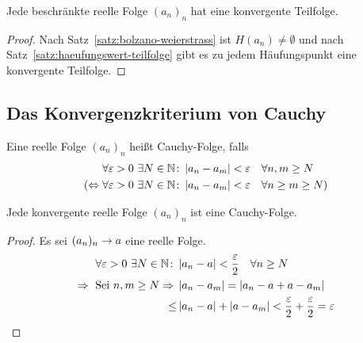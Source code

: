 \begin{korollar}
    \label{korollar:beschr-konv-teilfolge}
    Jede beschränkte reelle Folge $(a_n)_n$ hat eine konvergente Teilfolge.
    \begin{proof}
        Nach Satz~\ref{satz:bolzano-weierstrass} ist $H(a_n) \neq\emptyset$ und nach Satz~\ref{satz:haeufungswert-teilfolge} gibt es zu jedem Häufungspunkt eine konvergente Teilfolge.
    \end{proof}
\end{korollar}

\vfill

\subsection{Das Konvergenzkriterium von Cauchy}

\begin{definition}
    Eine reelle Folge $(a_n)_n$ heißt Cauchy-Folge, falls
    \begin{align*}
        &\forall\varepsilon > 0~\exists N\in\mathbb{N}\colon \left\lvert a_n - a_m\right\rvert < \varepsilon\quad\forall n,m \geq N\\
        (\Leftrightarrow{} &\forall \varepsilon > 0~\exists N\in\mathbb{N}\colon \left\lvert a_n - a_m\right\rvert < \varepsilon\quad\forall n\geq m\geq N)
    \end{align*}
\end{definition}

\begin{lemma} %
    \label{lemma:konv-cauchy}
    Jede konvergente reelle Folge $(a_n)_n$ ist eine Cauchy-Folge.
    \begin{proof}
        Es sei $(a_n)_n\rightarrow{} a$ eine reelle Folge.
        \begin{align*}
            \forall \varepsilon > 0~\exists N\in\mathbb{N}\colon &\left\lvert a_n-a\right\rvert < \frac{\varepsilon}{2}\quad\forall n\geq N\\
            \Rightarrow{}\text{ Sei }n,m\geq N \Rightarrow{} &\left\lvert a_n-a_m\right\rvert = \left\lvert a_n-a+a-a_m\right\rvert\\
            \leq &\left\lvert a_n-a\right\rvert + \left\lvert a-a_m\right\rvert < \frac{\varepsilon}{2} + \frac{\varepsilon}{2} = \varepsilon\qedhere
        \end{align*}
    \end{proof}
\end{lemma}

